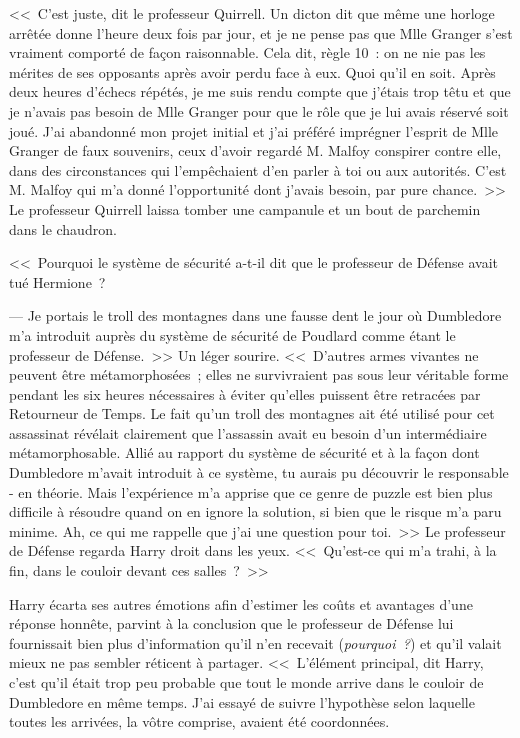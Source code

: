 <<~C'est juste, dit le professeur Quirrell. Un dicton dit que même une horloge arrêtée donne l'heure deux fois par jour, et je ne pense pas que Mlle Granger s'est vraiment comporté de façon raisonnable. Cela dit, règle 10~: on ne nie pas les mérites de ses opposants après avoir perdu face à eux. Quoi qu'il en soit. Après deux heures d'échecs répétés, je me suis rendu compte que j'étais trop têtu et que je n'avais pas besoin de Mlle Granger pour que le rôle que je lui avais réservé soit joué. J'ai abandonné mon projet initial et j'ai préféré imprégner l'esprit de Mlle Granger de faux souvenirs, ceux d'avoir regardé M. Malfoy conspirer contre elle, dans des circonstances qui l'empêchaient d'en parler à toi ou aux autorités. C'est M. Malfoy qui m'a donné l'opportunité dont j'avais besoin, par pure chance.~>> Le professeur Quirrell laissa tomber une campanule et un bout de parchemin dans le chaudron.

<<~Pourquoi le système de sécurité a-t-il dit que le professeur de Défense avait tué Hermione~?

--- Je portais le troll des montagnes dans une fausse dent le jour où Dumbledore m'a introduit auprès du système de sécurité de Poudlard comme étant le professeur de Défense.~>> Un léger sourire. <<~D'autres armes vivantes ne peuvent être métamorphosées~; elles ne survivraient pas sous leur véritable forme pendant les six heures nécessaires à éviter qu'elles puissent être retracées par Retourneur de Temps. Le fait qu'un troll des montagnes ait été utilisé pour cet assassinat révélait clairement que l'assassin avait eu besoin d'un intermédiaire métamorphosable. Allié au rapport du système de sécurité et à la façon dont Dumbledore m'avait introduit à ce système, tu aurais pu découvrir le responsable - en théorie. Mais l'expérience m'a apprise que ce genre de puzzle est bien plus difficile à résoudre quand on en ignore la solution, si bien que le risque m'a paru minime. Ah, ce qui me rappelle que j'ai une question pour toi.~>> Le professeur de Défense regarda Harry droit dans les yeux. <<~Qu'est-ce qui m'a trahi, à la fin, dans le couloir devant ces salles~?~>>

Harry écarta ses autres émotions afin d'estimer les coûts et avantages d'une réponse honnête, parvint à la conclusion que le professeur de Défense lui fournissait bien plus d'information qu'il n'en recevait (\emph{pourquoi~?}) et qu'il valait mieux ne pas sembler réticent à partager. <<~L'élément principal, dit Harry, c'est qu'il était trop peu probable que tout le monde arrive dans le couloir de Dumbledore en même temps. J'ai essayé de suivre l'hypothèse selon laquelle toutes les arrivées, la vôtre comprise, avaient été coordonnées.


